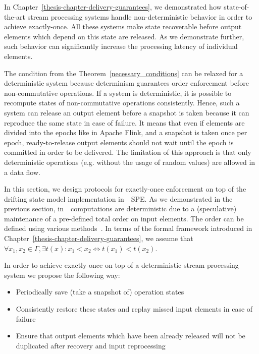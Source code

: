 
In Chapter~\ref{thesis-chapter-delivery-guarantees}, we demonstrated how state-of-the-art stream processing systems handle non-deterministic behavior in order to achieve exactly-once. All these systems make state recoverable before output elements which depend on this state are released. As we demonstrate further, such behavior can significantly increase the processing latency of individual elements.

The condition from the Theorem~\ref{necessary_conditions} can be relaxed for a deterministic system because determinism guarantees order enforcement before non-commutative operations. If a system is deterministic, it is possible to recompute states of non-commutative operations consistently. Hence, such a system can release an output element before a snapshot is taken because it can reproduce the same state in case of failure. It means that even if elements are divided into the epochs like in Apache Flink, and a snapshot is taken once per epoch, ready-to-release output elements should not wait until the epoch is committed in order to be delivered. The limitation of this approach is that only deterministic operations (e.g. without the usage of random values) are allowed in a data flow.

In this section, we design protocols for exactly-once enforcement on top of the drifting state model implementation in~\FlameStream\ SPE. As we demonstrated in the previous section, in~\FlameStream\, computations are deterministic due to a (speculative) maintenance of a pre-defined total order on input elements. The order can be defined using various methods~\cite{we2018seim}. In terms of the formal framework introduced in Chapter~\ref{thesis-chapter-delivery-guarantees}, we assume that $\forall x_1,x_2\in \Gamma, \exists t(x): x_1 < x_2 \Longleftrightarrow t(x_1) < t(x_2)$.

In order to achieve exactly-once on top of a deterministic stream processing system we propose the following way:
\begin{itemize}
    \item Periodically save (take a snapshot of) operation states
    \item Consistently restore these states and replay missed input elements in case of failure
    \item Ensure that output elements which have been already released will not be duplicated after recovery and input reprocessing
\end{itemize}

